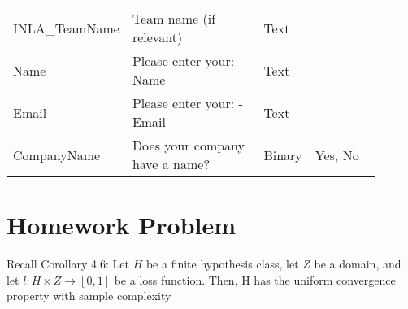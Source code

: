 \documentclass[12pt, letterpaper]{article}
\begin{document}
{\begin{longtable}{|p{0.2\linewidth}|p{0.4\linewidth}|p{0.1\linewidth}|p{0.2\linewidth}|}
INLA\_TeamName              & Team name (if relevant)                                                                                                                                                                                                                                                             & Text        &                                                                                                                                                                                                                                         \\
Name                         & Please enter your: - Name                                                                                                                                                                                                                                                           & Text        &                                                                                                                                                                                                                                         \\
Email                        & Please enter your: - Email                                                                                                                                                                                                                                                          & Text        &                                                                                                                                                                                                                                          \\
CompanyName            & Does your company have a name?                                                                                                                                                                                                                                                      & Binary      & Yes, No
\\* \bottomrule
\end{longtable} }

\section{Homework Problem}

Recall Corollary 4.6: Let $H$ be a finite hypothesis class, let $Z$ be a domain, and let $l : H \times  Z \to [0, 1]$ be a loss function. Then, H has the uniform convergence property with sample complexity
\end{document}
